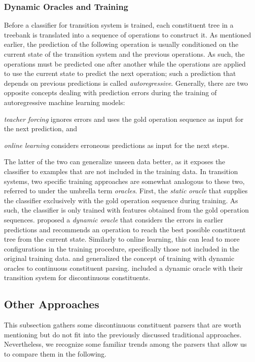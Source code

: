 \documentclass[../document.tex]{subfiles}
\begin{document}
    \subsubsection*{Dynamic Oracles and Training}
    Before a classifier for transition system is trained, each constituent tree in a treebank is translated into a sequence of operations to construct it.
    As mentioned earlier, the prediction of the following operation is usually conditioned on the current state of the transition system and the previous operations.
    As such, the operations must be predicted one after another while the operations are applied to use the current state to predict the next operation; such a prediction that depends on previous predictions is called \emph{autoregressive}.
    Generally, there are two opposite concepts dealing with prediction errors during the training of autoregressive machine learning models:
    \begin{compactitem}
        \item \emph{teacher forcing} ignores errors and uses the gold operation sequence as input for the next prediction, and
        \item \emph{online learning} considers erroneous predictions as input for the next steps.
    \end{compactitem}
    The latter of the two can generalize unseen data better, as it exposes the classifier to examples that are not included in the training data.
    In transition systems, two specific training approaches are somewhat analogous to these two, referred to under the umbrella term \emph{oracles}.
    First, the \emph{static oracle} that supplies the classifier exclusively with the gold operation sequence during training.
    As such, the classifier is only trained with features obtained from the gold operation sequences.
     proposed a \emph{dynamic oracle} that considers the errors in earlier predictions and recommends an operation to reach the best possible constituent tree from the current state.
    Similarly to online learning, this can lead to more configurations in the training procedure, specifically those not included in the original training data.
     and \citet{Cross16} generalized the concept of training with dynamic oracles to continuous constituent parsing.
     included a dynamic oracle with their transition system for discontinuous constituents.

    \subsection{Other Approaches}\label{sec:literature:others}
    This subsection gathers some discontinuous constituent parsers that are worth mentioning but do not fit into the previously discussed traditional approaches.
    Nevertheless, we recognize some familiar trends among the parsers that allow us to compare them in the following.
\end{document}
